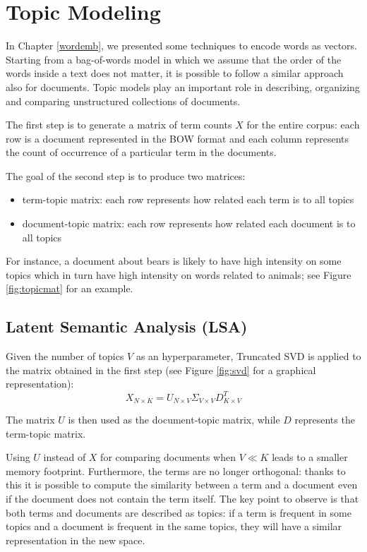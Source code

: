 \chapter{Topic Modeling}

In Chapter \ref{wordemb}, we presented some techniques to encode words as vectors.
Starting from a bag-of-words model in which we assume that the order of the words
inside a text does not matter, it is possible to follow a similar approach also for documents.
Topic models play an important role in describing, organizing and comparing unstructured collections of documents.

The first step is to generate a matrix of term counts $X$ for the entire corpus:
each row is a document represented in the BOW format and each column represents the count of occurrence
of a particular term in the documents.

The goal of the second step is to produce two matrices:
\begin{itemize}
    \item term-topic matrix: each row represents how related each term is to all topics
    \item document-topic matrix: each row represents how related each document is to all topics
\end{itemize}

For instance, a document about bears is likely to have high intensity on some topics which in turn have high
intensity on words related to animals; see Figure \ref{fig:topicmat} for an example.

\section{Latent Semantic Analysis (LSA)}
Given the number of topics $V$ as an hyperparameter,
Truncated SVD is applied to the matrix obtained in the first step
(see Figure \ref{fig:svd} for a graphical representation):
$$X_{N \times K} = U_{N \times V} \Sigma_{V \times V} D_{K \times V}^T$$

The matrix $U$ is then used as the document-topic matrix,
while $D$ represents the term-topic matrix.

Using $U$ instead of $X$ for comparing documents when $V \ll K$ leads to a smaller memory footprint.
Furthermore, the terms are no longer orthogonal: thanks to this it is possible to compute the similarity between
a term and a document even if the document does not contain the term itself.
The key point to observe is that both terms and documents are described as topics: if a term is frequent in some topics and
a document is frequent in the same topics, they will have a similar representation in the new space.

